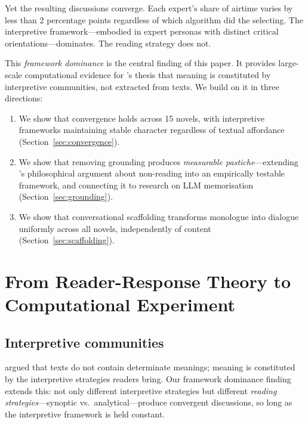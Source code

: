 \documentclass{article}
\begin{document}
Yet the resulting discussions converge.  Each expert's share of
airtime varies by less than 2 percentage points regardless of which
algorithm did the selecting.  The interpretive framework---embodied in
expert personas with distinct critical orientations---dominates.  The
reading strategy does not.

This \emph{framework dominance} is the central finding of this paper.
It provides large-scale computational evidence for
\textcite{fish1980text}'s thesis that meaning is constituted by
interpretive communities, not extracted from texts.  We build on it in
three directions:

\begin{enumerate}
\item We show that convergence holds across 15 novels, with
interpretive frameworks maintaining stable character regardless of
textual affordance (Section~\ref{sec:convergence}).

\item We show that removing grounding produces \emph{measurable
pastiche}---extending \textcite{bayard2007comment}'s philosophical
argument about non-reading into an empirically testable
framework, and connecting it to research on LLM memorisation
\parencite{carlini2021extracting} (Section~\ref{sec:grounding}).

\item We show that conversational scaffolding transforms monologue
into dialogue uniformly across all novels, independently of content
(Section~\ref{sec:scaffolding}).
\end{enumerate}


\section{From Reader-Response Theory to Computational Experiment}
\label{sec:theory}

\subsection{Interpretive communities}

\textcite{fish1980text} argued that texts do not contain determinate
meanings; meaning is constituted by the interpretive strategies readers
bring.  Our framework dominance finding extends this: not only different
interpretive strategies but different \emph{reading
strategies}---synoptic vs.\ analytical---produce convergent
discussions, so long as the interpretive framework is held constant.
\end{document}
